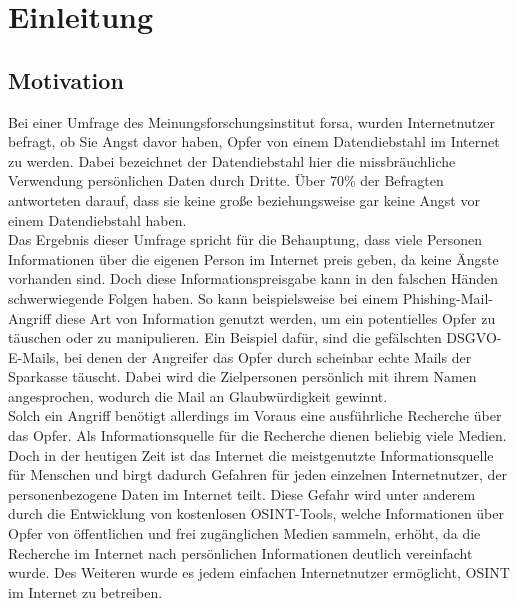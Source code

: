 \chapter{Einleitung}
\label{cha:einleitung}

\section{Motivation}
Bei einer Umfrage des Meinungsforschungsinstitut forsa, wurden Internetnutzer befragt, ob Sie Angst davor haben, Opfer von einem Datendiebstahl im Internet zu werden. Dabei bezeichnet der Datendiebstahl hier die missbräuchliche Verwendung persönlichen Daten durch Dritte. Über 70\% der Befragten antworteten darauf, dass sie keine große beziehungsweise gar keine Angst vor einem Datendiebstahl haben. \cite{AngstDatendiebstahl}\\
Das Ergebnis dieser Umfrage spricht für die Behauptung, dass viele Personen Informationen über die eigenen Person im Internet preis geben, da keine Ängste vorhanden sind. Doch diese Informationspreisgabe kann in den falschen Händen schwerwiegende Folgen haben. So kann beispielsweise bei einem Phishing-Mail-Angriff diese Art von Information genutzt werden, um ein potentielles Opfer zu täuschen oder zu manipulieren. 
Ein Beispiel dafür, sind die gefälschten DSGVO-E-Mails, bei denen der Angreifer das Opfer durch scheinbar echte Mails der Sparkasse täuscht. Dabei wird die Zielpersonen persönlich mit ihrem Namen angesprochen, wodurch die Mail an Glaubwürdigkeit gewinnt. \cite{VerbraucherzentraleNW}
\\
Solch ein Angriff benötigt allerdings im Voraus eine ausführliche Recherche über das Opfer. Als Informationsquelle für die Recherche dienen beliebig viele Medien. Doch in der heutigen Zeit ist das Internet die meistgenutzte Informationsquelle für Menschen und birgt dadurch Gefahren für jeden einzelnen Internetnutzer, der personenbezogene Daten im Internet teilt. \cite{Inforamtionsquellen} Diese Gefahr wird unter anderem durch die Entwicklung von kostenlosen OSINT-Tools, welche Informationen über Opfer von öffentlichen und frei zugänglichen Medien sammeln, erhöht, da die Recherche im Internet nach persönlichen Informationen deutlich vereinfacht wurde. Des Weiteren wurde es jedem einfachen Internetnutzer ermöglicht, OSINT im Internet zu betreiben.


